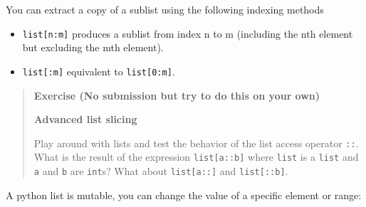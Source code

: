 You can extract a copy of a sublist using the following indexing methods

\begin{itemize}
\tightlist
\item
  \texttt{list{[}n:m{]}} produces a sublist from index n to m (including
  the nth element but excluding the mth element).
\item
  \texttt{list{[}:m{]}} equivalent to \texttt{list{[}0:m{]}}.
\end{itemize}

\begin{Shaded}
\begin{Highlighting}[]
\NormalTok{l[}\NormalTok{:}\NormalTok{]}
\end{Highlighting}
\end{Shaded}

\begin{Shaded}
\begin{Highlighting}[]
\NormalTok{[}\NormalTok{,}\NormalTok{]}
\end{Highlighting}
\end{Shaded}

\begin{quote}
\textbf{Exercise (No submission but try to do this on your own) }

\textbf{Advanced list slicing}

Play around with lists and test the behavior of the list access operator
\texttt{::}. What is the result of the expression
\texttt{list{[}a::b{]}} where \texttt{list} is a \texttt{list} and
\texttt{a} and \texttt{b} are \texttt{int}s? What about
\texttt{list{[}a::{]}} and \texttt{list{[}::b{]}}.
\end{quote}

A python list is mutable, you can change the value of a specific element
or range:

\begin{Shaded}
\begin{Highlighting}[]
\NormalTok{l[}\NormalTok{] }\OperatorTok{=} 
\end{Highlighting}
\end{Shaded}

\begin{Shaded}
\begin{Highlighting}[]
\NormalTok{[}\NormalTok{, }\NormalTok{, }\NormalTok{, }\StringTok{\textquotesingle{}4\textquotesingle{}}\NormalTok{, }\NormalTok{, []]}
\end{Highlighting}
\end{Shaded}

